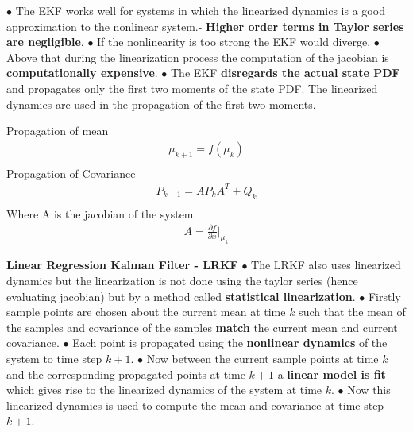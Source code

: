 \documentclass[landscape]{slides}
\begin{document}
	\begin{slide}
	$\bullet$ The EKF works well for systems in which the linearized dynamics is a good approximation to the nonlinear system.- {\bf Higher order terms in Taylor series are negligible}.\newline\newline 
	$\bullet$ If the nonlinearity is too strong the EKF would diverge. \newline\newline
	$\bullet$ Above that during the linearization process the computation of the jacobian is {\bf computationally expensive}. \newline\newline
	$\bullet$ The EKF {\bf disregards the actual state PDF} and propagates only the first two moments of the state PDF. The linearized dynamics are used in the propagation of the first two moments.
		\end{slide}
\begin{slide}
Propagation of mean
\begin{align*}
\mu_{k+1}=f(\mu_k)\\
\end{align*}
Propagation of Covariance
\begin{align*}
P_{k+1}=AP_kA^T+Q_k\\
\end{align*}
Where A is the jacobian of the system.
\begin{align*}
A=\frac{\partial{f}}{\partial{x}}|_{\mu_k}
\end{align*}
	\end{slide}
\begin{slide}

 {\bf Linear Regression Kalman Filter - LRKF}\newline \newline
	$\bullet$ The LRKF also uses linearized dynamics but the linearization is not done using the taylor series (hence evaluating jacobian) but by a method called {\bf statistical linearization}.\newline \newline 
	$\bullet$ Firstly sample points are chosen about the current mean at time $k$ such that the mean of the samples and covariance of the samples {\bf match} the current mean and current covariance.\newline \newline 
	$\bullet$ Each point is propagated using the {\bf nonlinear dynamics} of the system to time step $k+1$.\newline \newline
	$\bullet$ Now between the current sample points at time $k$ and the corresponding propagated points at time $k+1$ a {\bf linear model is fit} which gives rise to the linearized dynamics of the system at time $k$.\newline \newline
	$\bullet$ Now this linearized dynamics is used to compute the mean and covariance at time step $k+1$. 
		\end{slide}
\end{document}
